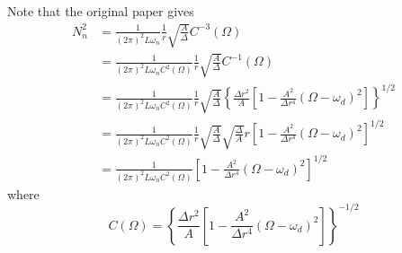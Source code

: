 \documentclass[english]{article}
\begin{document}
Note that the original paper gives 
\begin{align*}
N^{2}_{n} & =\frac{1}{\left(2\pi\right)^{2}L\omega_{n}}\frac{1}{r}\sqrt{\frac{A}{\Delta}}C^{-3}\left(\Omega\right)\\
 & =\frac{1}{\left(2\pi\right)^{2}L\omega_{n}C^{2}\left(\Omega\right)}\frac{1}{r}\sqrt{\frac{A}{\Delta}}C^{-1}\left(\Omega\right)\\
 & =\frac{1}{\left(2\pi\right)^{2}L\omega_{n}C^{2}\left(\Omega\right)}\frac{1}{r}\sqrt{\frac{A}{\Delta}}\left\{ \frac{\Delta r^{2}}{A}\left[1-\frac{A^{2}}{\Delta r^{4}}\left(\Omega-\omega_{d}\right)^{2}\right]\right\} ^{1/2}\\
 & =\frac{1}{\left(2\pi\right)^{2}L\omega_{n}C^{2}\left(\Omega\right)}\frac{1}{r}\sqrt{\frac{A}{\Delta}}\sqrt{\frac{\Delta}{A}}r\left[1-\frac{A^{2}}{\Delta r^{4}}\left(\Omega-\omega_{d}\right)^{2}\right]^{1/2}\\
 & =\frac{1}{\left(2\pi\right)^{2}L\omega_{n}C^{2}\left(\Omega\right)}\left[1-\frac{A^{2}}{\Delta r^{4}}\left(\Omega-\omega_{d}\right)^{2}\right]^{1/2}
\end{align*}
 where 
\[
C\left(\Omega\right)=\left\{ \frac{\Delta r^{2}}{A}\left[1-\frac{A^{2}}{\Delta r^{4}}\left(\Omega-\omega_{d}\right)^{2}\right]\right\} ^{-1/2}
\]
\end{document}
